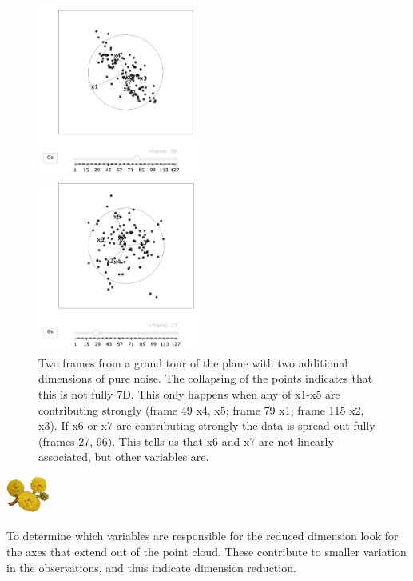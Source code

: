 \documentclass[
  letterpaper,
]{krantz}
\newcommand{\infobox}[1]{%
\noindent\colorbox{info!30}{%
\begin{minipage}{0.98\linewidth}%
    \centering%
    \begin{minipage}[c]{0.15\linewidth} %
      \includegraphics[width=1.5cm]{images/mulga-flowers2.png} %
    \end{minipage}%
    \hfill %
    \begin{minipage}[c]{0.8\linewidth} %
      \bigskip%
      \textsf{#1}%
      \bigskip%
    \end{minipage}%
    \hspace*{3mm}%
  \end{minipage}%
}%
}
\begin{document}
\begin{figure}

\begin{minipage}{0.50\linewidth}
\begin{center}
\includegraphics[width=2.08333in,height=\textheight]{images/plane_noise1.png}
\end{center}
\end{minipage}%
%
\begin{minipage}{0.50\linewidth}
\begin{center}
\includegraphics[width=2.08333in,height=\textheight]{images/plane_noise2.png}
\end{center}
\end{minipage}%

\caption{\label{fig-plane-noise-pdf}Two frames from a grand tour of the
plane with two additional dimensions of pure noise. The collapsing of
the points indicates that this is not fully 7D. This only happens when
any of x1-x5 are contributing strongly (frame 49 x4, x5; frame 79 x1;
frame 115 x2, x3). If x6 or x7 are contributing strongly the data is
spread out fully (frames 27, 96). This tells us that x6 and x7 are not
linearly associated, but other variables are. }

\end{figure}%

\infobox{To determine which variables are responsible for the reduced dimension look for the axes that extend out of the point cloud. These contribute to smaller variation in the observations, and thus indicate dimension reduction.}
\end{document}
